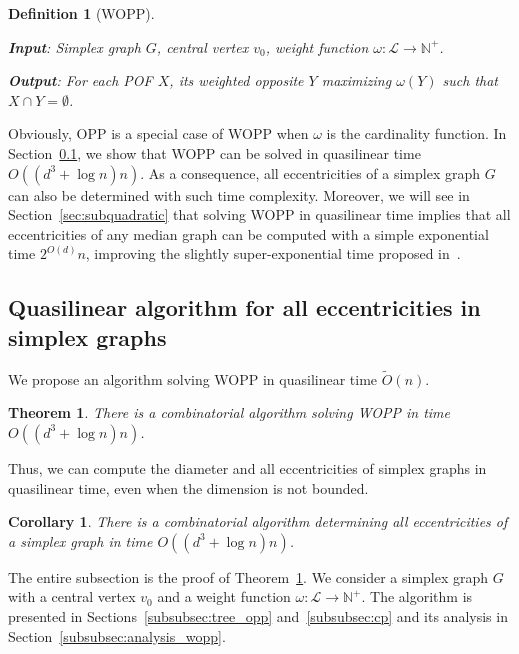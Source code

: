 \documentclass{article}
\newtheorem{theorem}{Theorem}
\newtheorem{definition}{Definition}
\newtheorem{corollary}{Corollary}
\begin{document}
\begin{definition}[WOPP]~

\textbf{Input}: Simplex graph $G$, central vertex $v_0$, weight function $\omega : \mathcal{L} \rightarrow \mathbb{N}^+$.

\textbf{Output}: For each POF $X$, its weighted opposite $Y$ maximizing $\omega(Y)$ such that $X \cap Y = \emptyset$.
\label{def:wdpp}
\end{definition}

Obviously, OPP is a special case of WOPP when $\omega$ is the cardinality function. In Section~\ref{subsec:partitioning}, we show that WOPP can be solved in quasilinear time $O((d^3+\log n)n)$. As a consequence, all eccentricities of a simplex graph $G$ can also be determined with such time complexity. Moreover, we will see in Section~\ref{sec:subquadratic} that solving WOPP in quasilinear time implies that all eccentricities of any median graph can be computed with a simple exponential time $2^{O(d)}n$, improving the slightly super-exponential time proposed in~\cite{BeHa21}.

\subsection{Quasilinear algorithm for all eccentricities in simplex graphs} \label{subsec:partitioning}

We propose an algorithm solving WOPP in quasilinear time $\tilde{O}(n)$. 

\begin{theorem}
There is a combinatorial algorithm solving WOPP in time $O((d^3+\log n)n)$. 
\label{th:solving_wopp}
\end{theorem}

Thus, we can compute the diameter and all eccentricities of simplex graphs in quasilinear time, even when the dimension is not bounded.

\begin{corollary}
There is a combinatorial algorithm determining all eccentricities of a simplex graph in time $O((d^3+\log n)n)$.
\label{co:linear_simplex}
\end{corollary}


The entire subsection is the proof of Theorem~\ref{th:solving_wopp}. We consider a simplex graph $G$ with a central vertex $v_0$ and a weight function $\omega : \mathcal{L} \rightarrow \mathbb{N}^+$. The algorithm is presented in Sections~\ref{subsubsec:tree_opp} and~\ref{subsubsec:cp} and its analysis in Section~\ref{subsubsec:analysis_wopp}.
\end{document}
